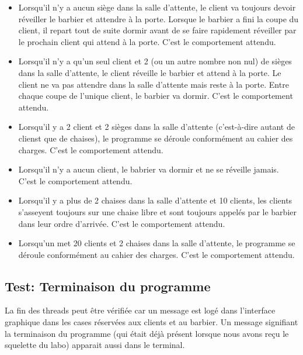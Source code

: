 \documentclass{article}
\begin{document}
\begin{itemize}
    \item Lorsqu'il n'y a aucun siège dans la salle d'attente, le client va toujours devoir réveiller le barbier et attendre à la porte.
    Lorsque le barbier a fini la coupe du client, il repart tout de suite dormir avant de se faire rapidement réveiller par le prochain
    client qui attend à la porte. C'est le comportement attendu. 
    \item Lorsqu'il n'y a qu'un seul client et 2 (ou un autre nombre non nul) de sièges dans la salle d'attente, le client réveille
    le barbier et attend à la porte. Le client ne va pas attendre dans la salle d'attente mais reste à la porte. Entre chaque coupe de 
    l'unique client, le barbier va dormir. C'est le comportement attendu.
    \item Lorsqu'il y a 2 client et 2 sièges dans la salle d'attente (c'est-à-dire autant de clienst que de chaises), le programme se 
    déroule conformément au cahier des charges. C'est le comportement attendu.
    \item Lorsqu'il n'y a aucun client, le babrier va dormir et ne se réveille jamais. C'est le comportement attendu. 
    \item Lorsqu'il y a plus de 2 chaises dans la salle d'attente et 10 clients, les clients s'asseyent toujours sur une chaise libre et 
    sont toujours appelés par le barbier dans leur ordre d'arrivée. C'est le comportement attendu.
    \item Lorsqu'un met 20 clients et 2 chaises dans la salle d'attente, le programme se déroule conformément au cahier des charges.
    C'est le comportement attendu.
\end{itemize}

\subsection*{Test: Terminaison du programme}

La fin des threads peut être vérifiée car un message est logé dans l'interface graphique dans les cases réservées aux clients et au barbier. 
Un message signifiant la terminaison du programme (qui était déjà présent lorsque nous avons reçu le squelette du labo) apparait aussi 
dans le terminal.
\end{document}
